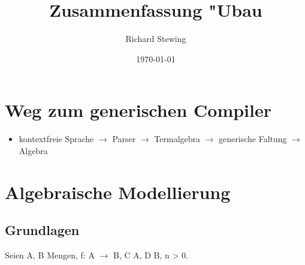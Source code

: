 \documentclass[11pt]{article}
\author{Richard Stewing}
\date{\today}
\title{Zusammenfassung "Ubau}
\begin{document}
\maketitle
\tableofcontents






\section{Weg zum generischen Compiler}
\label{sec-1}

\begin{itemize}
\item kontextfreie Sprache $\rightarrow$ Parser $\rightarrow$ Termalgebra $\rightarrow$ generische Faltung $\rightarrow$ Algebra
\end{itemize}

\section{Algebraische Modellierung}
\label{sec-2}

\subsection{Grundlagen}
\label{sec-2-1}

Seien A, B Mengen, f: A $\to$ B, C \subseteq A, D \subseteq B, n > 0.
\end{document}
